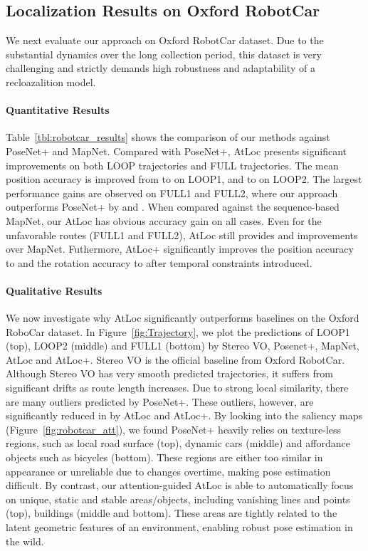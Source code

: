 \documentclass[letterpaper]{article}
\begin{document}
\subsection{Localization Results on Oxford RobotCar}
We next evaluate our approach on Oxford RobotCar dataset. Due to the substantial dynamics over the long collection period, this dataset is very challenging and strictly demands high robustness and adaptability of a recloazalition model. 

\paragraph{Quantitative Results} Table~\ref{tbl:robotcar_results} shows the comparison of our methods against PoseNet+ and MapNet. Compared with PoseNet+, AtLoc presents significant improvements on both LOOP trajectories and FULL trajectories. The mean position accuracy is improved from  to  on LOOP1, and  to  on LOOP2.
The largest performance gains are observed on FULL1 and FULL2, where our approach outperforms PoseNet+ by  and . When compared against the sequence-based MapNet, our AtLoc has obvious accuracy gain on all cases. Even for the unfavorable routes (FULL1 and FULL2), AtLoc still provides  and  improvements over MapNet. Futhermore, AtLoc+ significantly improves the position accuracy to  and the rotation accuracy to  after temporal constraints introduced.
\vspace{-0.2cm}

\paragraph{Qualitative Results} 
We now investigate why AtLoc significantly outperforms baselines on the Oxford RoboCar dataset.
In Figure~\ref{fig:Trajectory}, we plot the predictions of LOOP1 (top), LOOP2 (middle) and FULL1 (bottom) by Stereo VO, Posenet+, MapNet, AtLoc and AtLoc+. Stereo VO is the official baseline from Oxford RobotCar. Although Stereo VO has very smooth predicted trajectories, it suffers from significant drifts as route length increases. Due to strong local similarity, there are many outliers predicted by PoseNet+. These outliers, however, are significantly reduced in by AtLoc and AtLoc+.
By looking into the saliency maps (Figure~\ref{fig:robotcar_att}), we found PoseNet+ heavily relies on texture-less regions, such as local road surface (top), dynamic cars (middle) and affordance objects such as bicycles (bottom). These regions are either too similar in appearance or unreliable due to changes overtime, making pose estimation difficult. By contrast, our attention-guided AtLoc is able to automatically focus on unique, static and stable areas/objects, including vanishing lines and points (top), buildings (middle and bottom). These areas are tightly related to the latent geometric features of an environment, enabling robust pose estimation in the wild. 
\end{document}
